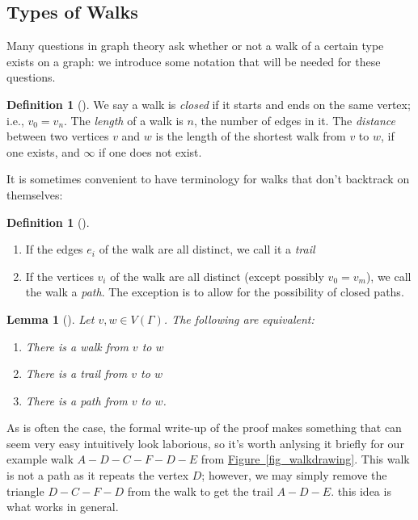 \documentclass[10pt,]{book}
\theoremstyle{plain}
\newtheorem{lemma}[theorem]{Lemma}
\theoremstyle{definition}
\newtheorem{definition}[theorem]{Definition}
\theoremstyle{definition}
\theoremstyle{definition}
\theoremstyle{definition}
\numberwithin{equation}{section}
\begin{document}
\subsection[{Types of Walks}]{Types of Walks}\label{subsection-15}
\hypertarget{p-105}{}%
Many questions in graph theory ask whether or not a walk of a certain type exists on a graph: we introduce some notation that will be needed for these questions.%
\begin{definition}[{}]\label{definition-14}
\hypertarget{p-106}{}%
We say a walk is \emph{closed} if it starts and ends on the same vertex; i.e., \(v_0=v_n\).  The \emph{length} of a walk is \(n\), the number of edges in it.  The \emph{distance} between two vertices \(v\) and \(w\) is the length of the shortest walk from \(v\) to \(w\), if one exists, and \(\infty\) if one does not exist.%
\end{definition}
\hypertarget{p-107}{}%
It is sometimes convenient to have terminology for walks that don't backtrack on themselves:%
\begin{definition}[{}]\label{definition-15}
\leavevmode%
\begin{enumerate}
\item\hypertarget{li-26}{}If the edges \(e_i\) of the walk are all distinct, we call it a \emph{trail}%
\item\hypertarget{li-27}{}If the vertices \(v_i\) of the walk are all distinct (except possibly \(v_0=v_m\)), we call the walk a \emph{path}.  The exception is to allow for the possibility of closed paths.%
\end{enumerate}
\end{definition}
\begin{lemma}[{}]\label{lemma-2}
\hypertarget{p-108}{}%
Let \(v,w\in V(\Gamma)\).  The following are equivalent:%
\leavevmode%
\begin{enumerate}
\item\hypertarget{li-28}{}There is a walk from \(v\) to \(w\)%
\item\hypertarget{li-29}{}There is a trail from \(v\) to \(w\)%
\item\hypertarget{li-30}{}There is a path from \(v\) to \(w\).%
\end{enumerate}
\end{lemma}
\hypertarget{p-109}{}%
As is often the case, the formal write-up of the proof makes something that can seem very easy intuitively look laborious, so it's worth anlysing it briefly for our example walk \(A-D-C-F-D-E\) from \hyperref[fig_walkdrawing]{Figure~\ref{fig_walkdrawing}}.  This walk is not a path as it repeats the vertex \(D\); however, we may simply remove the triangle \(D-C-F-D\) from the walk to get the trail \(A-D-E\).  this idea is what works in general.%
\end{document}
